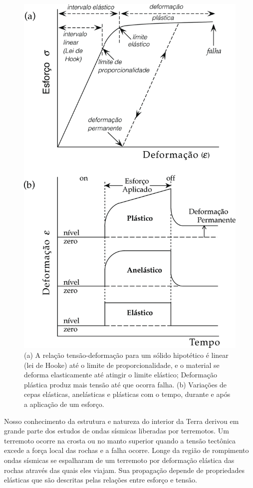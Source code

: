 \documentclass[]{book}
\theoremstyle{definition}
\theoremstyle{definition}
\theoremstyle{definition}
\theoremstyle{remark}
\begin{document}
\begin{figure}

{\centering \includegraphics[width=0.7\linewidth]{fig/Fig_03.02} 

}

\caption{(a) A relação tensão-deformação para um sólido hipotético é linear (lei de Hooke) até o limite de proporcionalidade, e o material se deforma elasticamente até atingir o limite elástico; Deformação plástica produz mais tensão até que ocorra falha. (b) Variações de cepas elásticas, anelásticas e plásticas com o tempo, durante e após a aplicação de um esforço.}\label{fig:hooke}
\end{figure}

Nosso conhecimento da estrutura e natureza do interior da Terra derivou em grande parte dos estudos de ondas sísmicas liberadas por terremotos. Um terremoto ocorre na crosta ou no manto superior quando a tensão tectônica excede a força local das rochas e a falha ocorre. Longe da região de rompimento ondas sísmicas se espalharam de um terremoto por deformação elástica das rochas através das quais eles viajam. Sua propagação depende de propriedades elásticas que são descritas pelas relações entre esforço e tensão.
\end{document}

